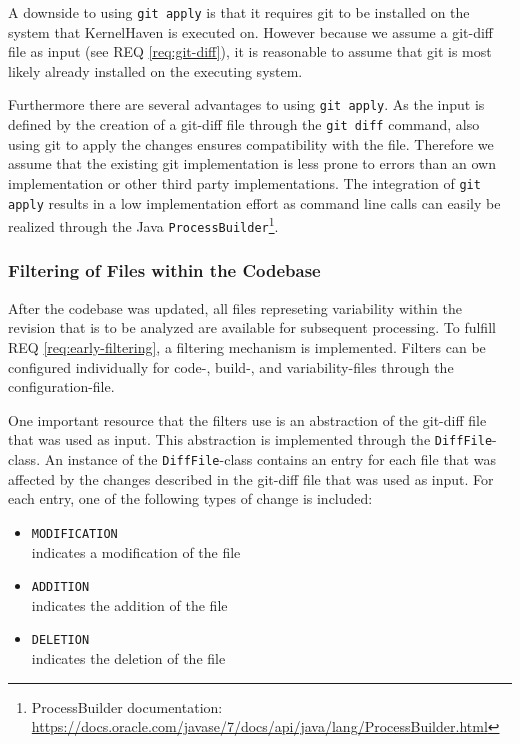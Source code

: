 \documentclass[a4paper]{article}
\begin{document}
 A downside to using \texttt{git apply} is that it requires git to be installed on the system that KernelHaven is executed on. However because we assume a git-diff file as input (see REQ \ref{req:git-diff}), it is reasonable to assume that git is most likely already installed on the executing system.

Furthermore there are several advantages to using \texttt{git apply}. As the input is defined by the creation of a git-diff file through the \texttt{git diff} command, also using git to apply the changes ensures compatibility with the file. Therefore we assume that the existing git implementation is less prone to errors than an own implementation or other third party implementations. The integration of \texttt{git apply} results in a low implementation effort as command line calls can easily be realized through the Java \texttt{ProcessBuilder}\footnote{ProcessBuilder documentation: \url{https://docs.oracle.com/javase/7/docs/api/java/lang/ProcessBuilder.html}}.

\subsubsection{Filtering of Files within the Codebase}\label{filtering-input}

After the codebase was updated, all files represeting variability within the revision that is to be analyzed are available for subsequent processing. To fulfill REQ \ref{req:early-filtering}, a filtering mechanism is implemented. Filters can be configured individually for code-, build-, and variability-files through the configuration-file.

One important resource that the filters use is an abstraction of the git-diff file that was used as input. This abstraction is implemented through the \texttt{DiffFile}-class.
An instance of the \texttt{DiffFile}-class contains an entry for each file that was affected by the changes described in the git-diff file that was used as input. For each entry, one of the following types of change is included:

\begin{itemize}
	\item \texttt{MODIFICATION} \\
	      indicates a modification of the file
	\item \texttt{ADDITION} \\
	      indicates the addition of the file
	\item \texttt{DELETION} \\
	      indicates the deletion of the file
\end{itemize}
\end{document}
